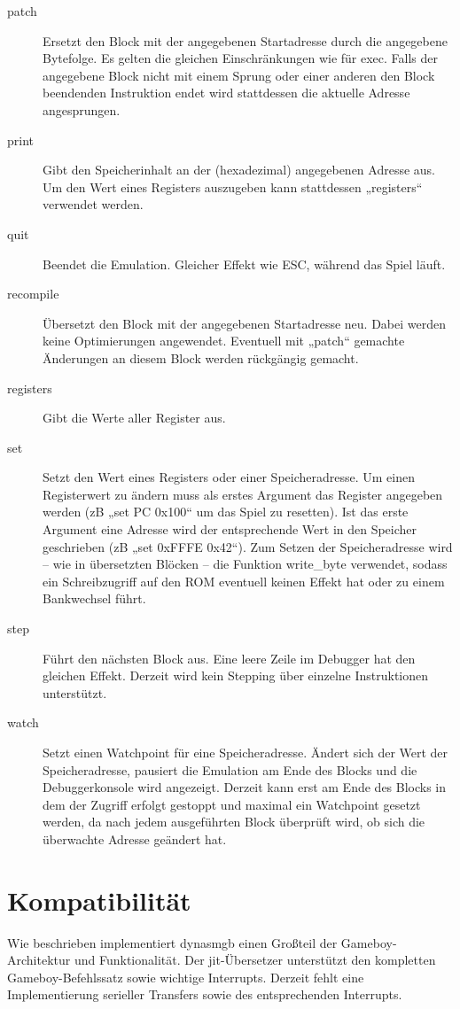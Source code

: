 \documentclass[a4paper]{scrartcl}
\begin{document}
\begin{description}
\item[patch] Ersetzt den Block mit der angegebenen Startadresse durch die angegebene Bytefolge. Es gelten die gleichen Einschränkungen wie für exec. Falls der angegebene Block nicht mit einem Sprung oder einer anderen den Block beendenden Instruktion endet wird stattdessen die aktuelle Adresse angesprungen.
\item[print] Gibt den Speicherinhalt an der (hexadezimal) angegebenen Adresse aus. Um den Wert eines Registers auszugeben kann stattdessen „registers“ verwendet werden.
\item[quit] Beendet die Emulation. Gleicher Effekt wie ESC, während das Spiel läuft.
\item[recompile] Übersetzt den Block mit der angegebenen Startadresse neu. Dabei werden keine Optimierungen angewendet. Eventuell mit „patch“ gemachte Änderungen an diesem Block werden rückgängig gemacht.
\item[registers] Gibt die Werte aller Register aus.
\item[set] Setzt den Wert eines Registers oder einer Speicheradresse. Um einen Registerwert zu ändern muss als erstes Argument das Register angegeben werden (zB „set PC 0x100“ um das Spiel zu resetten). Ist das erste Argument eine Adresse wird der entsprechende Wert in den Speicher geschrieben (zB „set 0xFFFE 0x42“). Zum Setzen der Speicheradresse wird -- wie in übersetzten Blöcken -- die Funktion write\_byte verwendet, sodass ein Schreibzugriff auf den ROM eventuell keinen Effekt hat oder zu einem Bankwechsel führt.
\item[step] Führt den nächsten Block aus. Eine leere Zeile im Debugger hat den gleichen Effekt. Derzeit wird kein Stepping über einzelne Instruktionen unterstützt.
\item[watch] Setzt einen Watchpoint für eine Speicheradresse. Ändert sich der Wert der Speicheradresse, pausiert die Emulation am Ende des Blocks und die Debuggerkonsole wird angezeigt. Derzeit kann erst am Ende des Blocks in dem der Zugriff erfolgt gestoppt und maximal ein Watchpoint gesetzt werden, da nach jedem ausgeführten Block überprüft wird, ob sich die überwachte Adresse geändert hat.
\end{description}
\section{Kompatibilität}

Wie beschrieben implementiert dynasmgb einen Großteil der Gameboy-Architektur und Funktionalität. Der jit-Übersetzer unterstützt den kompletten Gameboy-Befehlssatz sowie wichtige Interrupts. Derzeit fehlt eine Implementierung serieller Transfers sowie des entsprechenden Interrupts.
\end{document}
